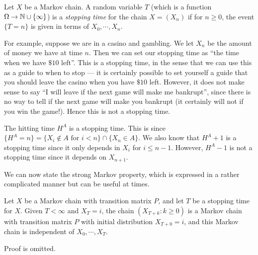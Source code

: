 \documentclass[a4paper]{article}
\begin{document}
\begin{defi}
  Let $X$ be a Markov chain. A random variable $T$ (which is a function $\Omega \to \mathbb{N}\cup \{\infty\}$) is a \emph{stopping time} for the chain $X = (X_n)$ if for $n \geq 0$, the event $\{T = n\}$ is given in terms of $X_0, \cdots, X_n$.
\end{defi}
For example, suppose we are in a casino and gambling. We let $X_n$ be the amount of money we have at time $n$. Then we can set our stopping time as ``the time when we have $\$10$ left''. This is a stopping time, in the sense that we can use this as a guide to when to stop --- it is certainly possible to set yourself a guide that you should leave the casino when you have $\$10$ left. However, it does not make sense to say ``I will leave if the next game will make me bankrupt'', since there is no way to tell if the next game will make you bankrupt (it certainly will not if you win the game!). Hence this is not a stopping time.

\begin{eg}
  The hitting time $H^A$ is a stopping time. This is since $\{H^A = n\} = \{X_i \not\in A\text{ for }i < n\} \cap \{X_n \in A\}$. We also know that $H^A + 1$ is a stopping time since it only depends in $X_i$ for $i \leq n - 1$. However, $H^A - 1$ is not a stopping time since it depends on $X_{n + 1}$.
\end{eg}

We can now state the strong Markov property, which is expressed in a rather complicated manner but can be useful at times.
\begin{thm}
  Let $X$ be a Markov chain with transition matrix $P$, and let $T$ be a stopping time for $X$. Given $T < \infty$ and $X_T = i$, the chain $(X_{T + k}: k \geq 0)$ is a Markov chain with transition matrix $P$ with initial distribution $X_{T + 0} = i$, and this Markov chain is independent of $X_0, \cdots, X_T$.
\end{thm}
Proof is omitted.
\end{document}
